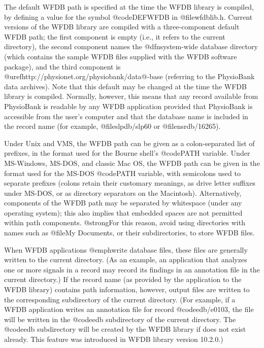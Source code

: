 {The default WFDB path is specified at the time the WFDB library is
compiled, by defining a value for the symbol @code{DEFWFDB} in
@file{wfdblib.h}.  Current versions of the WFDB library are compiled
with a three-component default WFDB path; the first component is empty
(i.e., it refers to the current directory), the second component names
the @dfn{system-wide database directory} (which contains the sample WFDB
files supplied with the WFDB software package), and the third component
is @uref{http://physionet.org/physiobank/data@-base} (referring to the
PhysioBank data archives).  Note that this default may be changed at the
time the WFDB library is compiled.  Normally, however, this means that
any record available from PhysioBank is readable by any WFDB application
provided that PhysioBank is accessible from the user's computer and that
the database name is included in the record name (for example,
@file{slpdb/slp60} or @file{nsrdb/16265}).

Under Unix and VMS, the WFDB path can be given as a colon-separated list
of prefixes, in the format used for the Bourne shell's @code{PATH}
variable.  Under MS-Windows, MS-DOS, and classic Mac OS, the WFDB path can be
given in the format used for the MS-DOS @code{PATH} variable, with
semicolons used to separate prefixes (colons retain their customary
meanings, as drive letter suffixes under MS-DOS, or as directory
separators on the Macintosh).  Alternatively, components of the WFDB
path may be separated by whitespace (under any operating system); this
also implies that embedded spaces are not permitted within path
components.  @strong{For this reason, avoid using directories with names
such as @file{My Documents}, or their subdirectories, to store WFDB files.}

When WFDB applications @emph{write} database files, these files are
generally written to the current directory.  (As an example, an
application that analyzes one or more signals in a record may record its
findings in an annotation file in the current directory.)  If the record
name (as provided by the application to the WFDB library) contains path
information, however, output files are written to the corresponding
subdirectory of the current directory.  (For example, if a WFDB
application writes an annotation file for record @code{edb/e0103}, the
file will be written in the @code{edb} subdirectory of the current
directory.  The @code{edb} subdirectory will be created by the WFDB
library if does not exist already.  This feature was introduced in WFDB
library version 10.2.0.)

}
